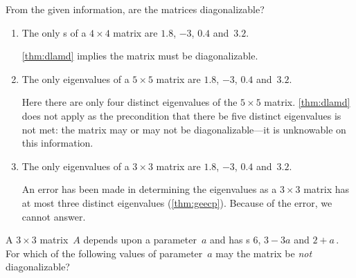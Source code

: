 \begin{example} 
From the given information, are the matrices diagonalizable?
\begin{enumerate}
\item The only s of a \(4\times 4\) matrix are \(1.8\), \(-3\), \(0.4\) and~\(3.2\).
\begin{solution} 
\autoref{thm:dlamd} implies the matrix must be diagonalizable.
\end{solution}

\item The only eigenvalues of a \(5\times 5\) matrix are \(1.8\), \(-3\), \(0.4\) and~\(3.2\).
\begin{solution} 
Here there are only four distinct eigenvalues of the \(5\times5\) matrix.
\autoref{thm:dlamd} does not apply as the precondition that there be five distinct eigenvalues is not met: the matrix may or may not be diagonalizable---it is unknowable on this information.
\end{solution}

\item The only eigenvalues of a \(3\times 3\) matrix are \(1.8\), \(-3\), \(0.4\) and~\(3.2\).
\begin{solution} 
An error has been made in determining the eigenvalues as a \(3\times3\) matrix has at most three distinct eigenvalues (\autoref{thm:geecp}).
Because of the error, we cannot answer.
\end{solution}

\end{enumerate}
\end{example}



\begin{activity}
A \(3\times3\) matrix~\(A\) depends upon a parameter~\(a\) and has s \(6\), \(3-3a\) and \(2+a\)\,.
For which of the following values of parameter~\(a\) may the matrix be \emph{not} diagonalizable?
\end{activity}





